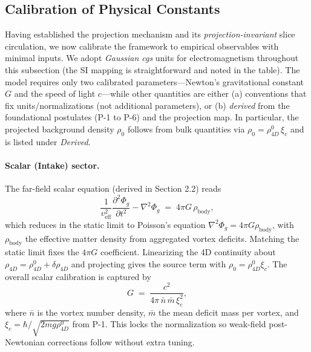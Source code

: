 \subsection{Calibration of Physical Constants}

Having established the projection mechanism and its \emph{projection-invariant} slice circulation, we now calibrate the framework to empirical observables with minimal inputs. We adopt \emph{Gaussian cgs} units for electromagnetism throughout this subsection (the SI mapping is straightforward and noted in the table). The model requires only two calibrated parameters---Newton's gravitational constant $G$ and the speed of light $c$---while other quantities are either (a) conventions that fix units/normalizations (not additional parameters), or (b) \emph{derived} from the foundational postulates (P-1 to P-6) and the projection map. In particular, the projected background density $\rho_0$ follows from bulk quantities via $\rho_0=\rho_{4D}^0\,\xi_c$ and is listed under \emph{Derived}.

\paragraph{Scalar (Intake) sector.}
The far-field scalar equation (derived in Section 2.2) reads
\begin{equation}
\frac{1}{v_{\text{eff}}^{2}}\frac{\partial^{2}\Phi_g}{\partial t^{2}}-\nabla^{2}\Phi_g
 \;=\;4\pi G\,\rho_{\text{body}},
\end{equation}
which reduces in the static limit to Poisson's equation $\nabla^2\Phi_g=4\pi G\rho_{\text{body}}$, with $\rho_{\text{body}}$ the effective matter density from aggregated vortex deficits. Matching the static limit fixes the $4\pi G$ coefficient. Linearizing the 4D continuity about $\rho_{4D}=\rho_{4D}^{0}+\delta\rho_{4D}$ and projecting gives the source term with $\rho_0=\rho_{4D}^{0}\xi_c$. The overall scalar calibration is captured by
\begin{equation}
G \;=\; \frac{c^{2}}{4\pi\,\bar n\,\bar m\,\xi_c^{2}},
\end{equation}
where $\bar n$ is the vortex number density, $\bar m$ the mean deficit mass per vortex, and $\xi_c=\hbar/\sqrt{2mg\rho_{4D}^0}$ from P-1. This locks the normalization so weak-field post-Newtonian corrections follow without extra tuning.


